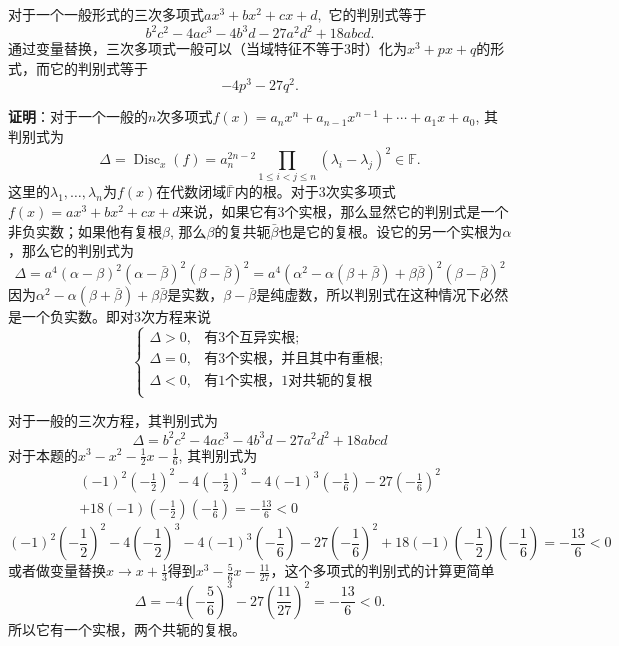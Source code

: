 对于一个一般形式的三次多项式$ax^3 + bx^2 + cx + d,$ 它的判别式等于
$$b^{2}c^{2}-4ac^{3}-4b^{3}d-27a^{2}d^{2}+18abcd.$$
通过变量替换，三次多项式一般可以（当域特征不等于3时）化为$x^3 + px + q$的形式，而它的判别式等于
$$-4p^3 - 27q^2.$$

\ifIncludeAnswer

\newpageorvspace

{\bf 证明}：对于一个一般的$n$次多项式$f(x) = a_{n}x^{n}+a_{n-1}x^{n-1}+\cdots +a_{1}x+a_{0}$, 其判别式为
$$\Delta = \operatorname{Disc}_x(f) = a_n^{2n-2} \prod_{1 \leqslant i < j \leqslant n} (\lambda_i - \lambda_j)^2 \in \mathbb{F}.$$
这里的$\lambda_1, \ldots, \lambda_n$为$f(x)$在代数闭域$\bar{\mathbb{F}}$内的根。对于3次实多项式$f(x) = ax^3+bx^2+cx+d$来说，如果它有3个实根，那么显然它的判别式是一个非负实数；如果他有复根$\beta$, 那么$\beta$的复共轭$\bar{\beta}$也是它的复根。设它的另一个实根为$\alpha$，那么它的判别式为
$$\Delta = a^4 (\alpha-\beta)^2(\alpha-\bar{\beta})^2(\beta-\bar{\beta})^2 = a^4 (\alpha^2-\alpha(\beta+\bar{\beta})+\beta\bar{\beta})^2 (\beta-\bar{\beta})^2$$
因为$\alpha^2-\alpha(\beta+\bar{\beta})+\beta\bar{\beta}$是实数，$\beta-\bar{\beta}$是纯虚数，所以判别式在这种情况下必然是一个负实数。即对3次方程来说
$$
\begin{cases}
\Delta > 0, & \text{有3个互异实根}; \\
\Delta = 0, & \text{有3个实根，并且其中有重根}; \\
\Delta < 0, & \text{有1个实根，1对共轭的复根} \\
\end{cases}
$$

对于一般的三次方程，其判别式为
$$\Delta = b^{2}c^{2}-4ac^{3}-4b^{3}d-27a^{2}d^{2}+18abcd$$
对于本题的$x^3 - x^2 - \frac{1}{2}x - \frac{1}{6}$, 其判别式为
\ifLargeLayout
\begin{multline*}
(-1)^2 \left( -\frac{1}{2} \right)^2 - 4 \left( -\frac{1}{2} \right)^3 - 4(-1)^3 \left( -\frac{1}{6} \right) - 27 \left( -\frac{1}{6} \right)^2 \\
+ 18(-1) \left( -\frac{1}{2} \right) \left( -\frac{1}{6} \right) = -\frac{13}{6} < 0
\end{multline*}
\else
$$(-1)^2 \left( -\frac{1}{2} \right)^2 - 4 \left( -\frac{1}{2} \right)^3 - 4(-1)^3 \left( -\frac{1}{6} \right) - 27 \left( -\frac{1}{6} \right)^2 + 18(-1) \left( -\frac{1}{2} \right) \left( -\frac{1}{6} \right) = -\frac{13}{6} < 0$$
\fi  %
或者做变量替换$x\to x+\frac{1}{3}$得到$x^{3} - \frac{5}{6}x - \frac{11}{27}$，这个多项式的判别式的计算更简单
$$\Delta = -4 \left( -\frac{5}{6} \right)^3 - 27 \left( \frac{11}{27} \right)^2 = -\frac{13}{6} < 0.$$
所以它有一个实根，两个共轭的复根。

\fi  %








